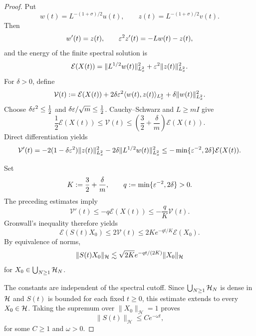 \begin{proof}
Put
\[
 w(t)=L^{-(1+\sigma)/2}u(t),\qquad
 z(t)=L^{-(1+\sigma)/2}v(t).
\]
Then
\[
 w'(t)=z(t),\qquad \varepsilon^2z'(t)=-Lw(t)-z(t),
\]
and the energy of the finite spectral solution is
\[
 \mathcal E(X(t)) 
 =\|L^{1/2}w(t)\|_{L^2_x}^2
    +\varepsilon^2\|z(t)\|_{L^2_x}^2.
\]
For \(\delta>0\), define
\[
 \mathcal V(t)
   :=\mathcal E (X(t)) +2\delta\varepsilon^2\langle w(t),z(t)\rangle_{L^2_x}
                    +\delta\|w(t)\|_{L^2_x}^2.
\]
Choose \(\delta\varepsilon^2\leq\frac12\) and
\(\delta\varepsilon/\sqrt m\leq\frac12\).
Cauchy--Schwarz and \(L\geq mI\) give
\[
 \frac12\mathcal E(X(t))\leq\mathcal V(t)
       \leq\left(\frac32+\frac{\delta}{m}\right)\mathcal E(X(t)).
\]
Direct differentiation yields
\[
 \mathcal V'(t)
  =-2(1-\delta\varepsilon^2)\|z(t)\|_{L^2_x}^2
      -2\delta\|L^{1/2}w(t)\|_{L^2_x}^2
  \leq-\min\{\varepsilon^{-2},2\delta\}\mathcal E(X(t)).
\]

Set
\[
 K:=\frac32+\frac{\delta}{m},
 \qquad q:=\min\{\varepsilon^{-2},2\delta\}>0.
\]
The preceding estimates imply
\[
 \mathcal V'(t)
 \leq-q\mathcal E(X(t))
 \leq-\frac{q}{K}\mathcal V(t).
\]
Gronwall's inequality therefore yields
\[
 \mathcal E(S(t)X_0)
 \leq 2\mathcal V(t)
 \leq 2K e^{-qt/K}\mathcal E(X_0).
\]
By equivalence of norms,
\[
 \|S(t)X_0\|_{\mathcal H}
 \lesssim \sqrt{2K} e^{-qt/(2K)}\|X_0\|_{\mathcal H}
\]
for $X_0\in\bigcup_{N\geq1}\mathcal{H}_N$.

\noindent
The constants are independent of the spectral cutoff.
Since $\bigcup_{N\geq1}\mathcal{H}_N$ is dense in $\mathcal{H}$ and $S(t)$
is bounded for each fixed $t\geq0$, this estimate extends
to every $X_0\in\mathcal{H}$. Taking the supremum over
$\|X_0\|_{\mathcal H}=1$ proves
\[
 \|S(t)\|_{\mathcal H}
 \leq C e^{-\omega t},
\]
for some $C\geq1$ and $\omega>0$.



\end{proof}
